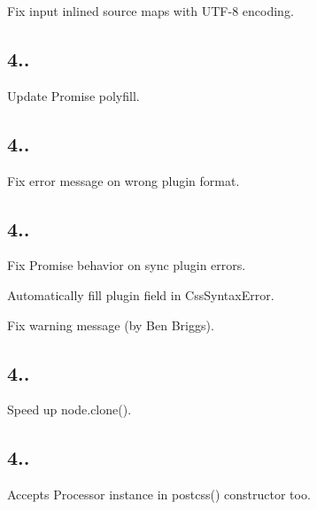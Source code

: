 \begin{DoxyItemize}
\item Fix input inlined source maps with U\+T\+F-\/8 encoding.
\end{DoxyItemize}

\subsection*{4..}


\begin{DoxyItemize}
\item Update Promise polyfill.
\end{DoxyItemize}

\subsection*{4..}


\begin{DoxyItemize}
\item Fix error message on wrong plugin format.
\end{DoxyItemize}

\subsection*{4..}


\begin{DoxyItemize}
\item Fix Promise behavior on sync plugin errors.
\item Automatically fill {\ttfamily plugin} field in {\ttfamily Css\+Syntax\+Error}.
\item Fix warning message (by Ben Briggs).
\end{DoxyItemize}

\subsection*{4..}


\begin{DoxyItemize}
\item Speed up {\ttfamily node.\+clone()}.
\end{DoxyItemize}

\subsection*{4..}


\begin{DoxyItemize}
\item Accepts {\ttfamily Processor} instance in {\ttfamily postcss()} constructor too.
\end{DoxyItemize}


